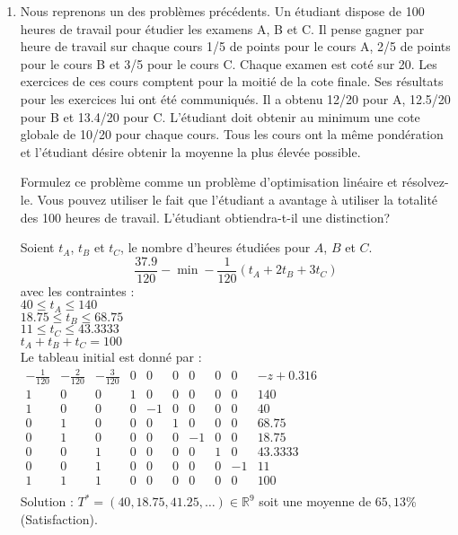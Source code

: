 \begin{enumerate}
  \item Nous reprenons un des problèmes précédents. Un étudiant dispose de 100 heures de travail pour
    étudier les examens A, B et C. Il pense gagner par heure de travail sur chaque cours 1/5 de points pour
    le cours A, 2/5 de points pour le cours B et 3/5 pour le cours C. Chaque examen est coté sur 20. Les
    exercices de ces cours comptent pour la moitié de la cote finale. Ses résultats pour les exercices lui
    ont été communiqués. Il a obtenu 12/20 pour A, 12.5/20 pour B et 13.4/20 pour C.  L'étudiant doit obtenir au minimum une cote globale de 10/20 pour chaque
    cours. Tous les cours ont la même pondération et l'étudiant désire obtenir la   moyenne la plus élevée possible.

    Formulez ce problème comme un problème d'optimisation linéaire  et résolvez-le. Vous pouvez utiliser le fait que l'étudiant a avantage à utiliser la
    totalité des 100 heures de travail. L'étudiant obtiendra-t-il une distinction?





    \begin{solution}
      Soient $t_{A}$, $t_{B}$ et $t_{C}$, le nombre d'heures étudiées pour $A$, $B$ et $C$.
      \newline
      $$ \frac{37.9}{120} -\min - \frac{1}{120}(t_{A} + 2t_{B} + 3t_{C}) $$
      avec les contraintes : \\
      \newline
      $40 \le t_{A} \le 140$ \\
      $18.75 \le t_{B} \le 68.75 $ \\
      $11 \le t_{C} \le 43.3333$ \\
      $t_{A} + t_{B} + t_{C} = 100$ \\
      \newline
      Le tableau initial est donné par : \\
      \newline
      $\begin{array}
      {ccccccccc|l}
      -\frac{1}{120} & -\frac{2}{120} & -\frac{3}{120} &0&0&0&0&0&0& -z + 0.316\\ \hline
      1&0&0&1&0&0&0&0&0&140 \\
      1&0&0&0&-1&0&0&0&0&40 \\
      0&1&0&0&0&1&0&0&0&68.75 \\
      0&1&0&0&0&0&-1&0&0&18.75 \\
      0&0&1&0&0&0&0&1&0&43.3333 \\
      0&0&1&0&0&0&0&0&-1&11 \\
      1&1&1&0&0&0&0&0&0&100
      \\\end{array}$\\
      \newline
      \newline
      Solution : $T^{*} = (40,18.75,41.25,\dots) \in \mathbb{R}^{9}$ soit une moyenne de $65,13$\% (Satisfaction).
    \end{solution}


\end{enumerate}
